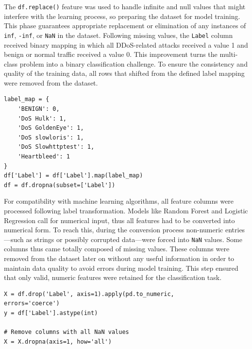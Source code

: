 \documentclass[conference]{IEEEtran}
\begin{document}
The \texttt{df.replace()} feature was used to handle infinite and null values that might interfere with the learning process, so preparing the dataset for model training. This phase guarantees appropriate replacement or elimination of any instances of \texttt{inf}, \texttt{-inf}, or \texttt{NaN} in the dataset. Following missing values, the \texttt{Label} column received binary mapping in which all DDoS-related attacks received a value 1 and benign or normal traffic received a value 0. This improvement turns the multi-class problem into a binary classification challenge. To ensure the consistency and quality of the training data, all rows that shifted from the defined label mapping were removed from the dataset.

\begin{center}
\begin{scriptsize}
\begin{verbatim}
label_map = {
    'BENIGN': 0,
    'DoS Hulk': 1,
    'DoS GoldenEye': 1,
    'DoS slowloris': 1,
    'DoS Slowhttptest': 1,
    'Heartbleed': 1
}
df['Label'] = df['Label'].map(label_map)
df = df.dropna(subset=['Label'])
\end{verbatim}
\end{scriptsize}
\end{center}



For compatibility with machine learning algorithms, all feature columns were processed following label transformation. Models like Random Forest and Logistic Regression call for numerical input, thus all features had to be converted into numerical form. To reach this, during the conversion process non-numeric entries—such as strings or possibly corrupted data—were forced into \texttt{NaN} values. Some columns thus came totally composed of missing values. These columns were removed from the dataset later on without any useful information in order to maintain data quality to avoid errors during model training. This step ensured that only valid, numeric features were retained for the classification task.

\begin{scriptsize}
\begin{verbatim}
X = df.drop('Label', axis=1).apply(pd.to_numeric, 
errors='coerce')
y = df['Label'].astype(int)

# Remove columns with all NaN values
X = X.dropna(axis=1, how='all')
\end{verbatim}
\end{scriptsize}
\end{document}
